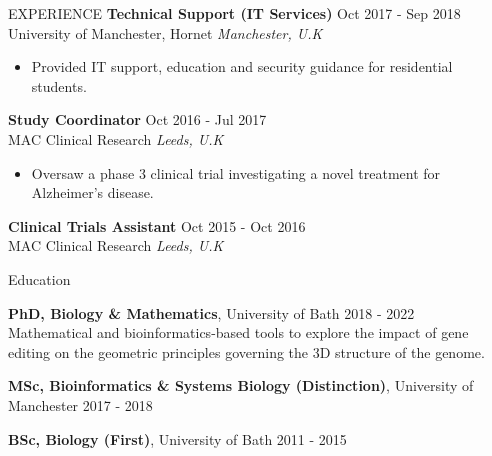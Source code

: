 \documentclass{resume} %
\begin{document}
\begin{rSection}{EXPERIENCE}
\textbf{Technical Support (IT Services)} \hfill Oct 2017 - Sep 2018 \\
University of Manchester, Hornet \hfill \textit{Manchester, U.K}
 \begin{itemize}
    \itemsep -3pt {} 
    \item Provided IT support, education and security guidance for residential students.
 \end{itemize}

\textbf{Study Coordinator} \hfill Oct 2016 - Jul 2017 \\
MAC Clinical Research \hfill \textit{Leeds, U.K}
 \begin{itemize}
    \itemsep -3pt {} 
    \item Oversaw a phase 3 clinical trial investigating a novel treatment for Alzheimer’s disease.
 \end{itemize}

\textbf{Clinical Trials Assistant} \hfill Oct 2015 - Oct 2016 \\
MAC Clinical Research \hfill \textit{Leeds, U.K}

\end{rSection} 


\begin{rSection}{Education}

{\bf PhD, Biology \& Mathematics}, University of Bath \hfill {2018 - 2022} \\
Mathematical and bioinformatics-based tools to explore the impact of gene editing on the geometric principles governing the 3D structure of the genome.

{\bf MSc, Bioinformatics \& Systems Biology (Distinction)}, University of Manchester \hfill {2017 - 2018}

{\bf BSc, Biology (First)}, University of Bath \hfill {2011 - 2015}

\end{rSection}

\end{document}
